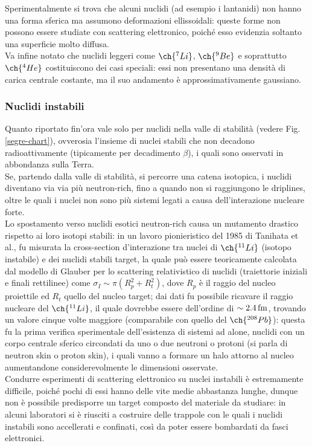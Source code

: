 Sperimentalmente si trova che alcuni nuclidi (ad esempio i lantanidi) non hanno una forma sferica ma assumono deformazioni ellissoidali: queste forme non possono essere studiate con scattering elettronico, poiché esso evidenzia soltanto una superficie molto diffusa.\\
Va infine notato che nuclidi leggeri come $ \ch{^{7}Li} $, $ \ch{^{9}Be} $ e soprattutto $ \ch{^{4}He} $ costituiscono dei casi speciali: essi non presentano una densità di carica centrale costante, ma il suo andamento è approssimativamente gaussiano.

\subsubsection{Nuclidi instabili}

Quanto riportato fin'ora vale solo per nuclidi nella valle di stabilità (vedere Fig. \ref{segre-chart}), ovverosia l'insieme di nuclei stabili che non decadono radioattivamente (tipicamente per decadimento $ \beta $), i quali sono osservati in abbondanza sulla Terra.\\
Se, partendo dalla valle di stabilità, si percorre una catena isotopica, i nuclidi diventano via via più neutron-rich, fino a quando non si raggiungono le driplines, oltre le quali i nuclei non sono più sistemi legati a causa dell'interazione nucleare forte.\\
Lo spostamento verso nuclidi esotici neutron-rich causa un mutamento drastico rispetto ai loro isotopi stabili: in un lavoro pionieristico del 1985 di Tanihata et al., fu misurata la cross-section d'interazione tra nuclei di $ \ch{^{11}Li} $ (isotopo instabile) e dei nuclidi stabili target, la quale può essere teoricamente calcolata dal modello di Glauber per lo scattering relativistico di nuclidi (traiettorie iniziali e finali rettilinee) come $ \sigma_I \sim \pi \left( R_p^2 + R_t^2 \right) $, dove $ R_p $ è il raggio del nucleo proiettile ed $ R_t $ quello del nucleo target; dai dati fu possibile ricavare il raggio nucleare del $ \ch{^{11}Li} $, il quale dovrebbe essere dell'ordine di $ \sim 2.4\,\mathrm{fm} $, trovando un valore cinque volte maggiore (comparabile con quello del $ \ch{^{208}Pb} $): questa fu la prima verifica sperimentale dell'esistenza di sistemi ad alone, nuclidi con un corpo centrale sferico circondati da uno o due neutroni o protoni (si parla di neutron skin o proton skin), i quali vanno a formare un halo attorno al nucleo aumentandone considerevolmente le dimensioni osservate.\\
Condurre esperimenti di scattering elettronico su nuclei instabili è estremamente difficile, poiché pochi di essi hanno delle vite medie abbastanza lunghe, dunque non è possibile predisporre un target composto del materiale da studiare: in alcuni laboratori si è riusciti a costruire delle trappole con le quali i nuclidi instabili sono accellerati e confinati, così da poter essere bombardati da fasci elettronici.


